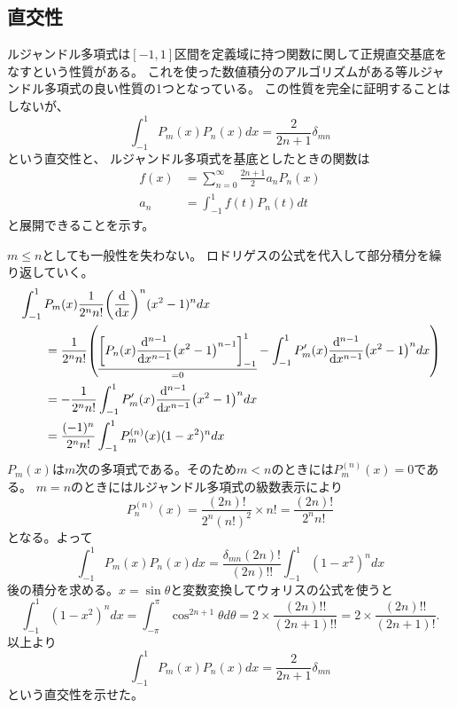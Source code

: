 \documentclass[../../master.tex]{subfiles}
\begin{document}
\subsection{直交性}
ルジャンドル多項式は\([-1, 1]\)区間を定義域に持つ関数に関して正規直交基底をなすという性質がある。
これを使った数値積分のアルゴリズムがある等ルジャンドル多項式の良い性質の1つとなっている。
この性質を完全に証明することはしないが、
\begin{equation}
	\int_{-1}^{1} P_m(x) P_n(x) dx = \frac{2}{2n+1}\delta_{mn}
\end{equation}
という直交性と、
ルジャンドル多項式を基底としたときの関数は
\begin{align}
	f(x) & = \sum_{n=0}^{\infty} \frac{2n+1}{2}a_n P_n(x) \\
	a_n  & =\int_{-1}^{1}f(t)P_n(t) dt
\end{align}
と展開できることを示す。

\(m\leq n\)としても一般性を失わない。
ロドリゲスの公式を代入して部分積分を繰り返していく。
\begin{equation}\begin{aligned}[b]
    & \int_{-1}^{1} P_m(x) \frac{1}{2^n n!} \qty(\dv{x})^n (x^2-1)^n dx \\
	 & \qquad = \frac{1}{2^n n!}
	\qty(
	\underset{=0}{\underline{
			\qty[P_n(x)\dv[n-1]{x}(x^2-1)^{n-1}]_{-1}^{1}
		}}
	- \int_{-1}^{1}P_m'(x)\dv[n-1]{x}(x^2-1)^n dx
	)                                                                           \\
	 & \qquad=-\frac{1}{2^n n!}\int_{-1}^{1}P_m'(x)\dv[n-1]{x}(x^2-1)^n dx      \\
	 & \qquad=\frac{(-1)^n}{2^n n!}\int_{-1}^{1} P_m^{(n)}(x)(1-x^2)^n dx
\end{aligned}\end{equation}
\(P_m(x)\)は\(m\)次の多項式である。そのため\(m<n\)のときには\(P_m^{(n)}(x)=0\)である。
\(m=n\)のときにはルジャンドル多項式の級数表示により
\begin{equation}
	P_n^{(n)}(x) = \frac{(2n)!}{2^n (n!)^2}\times n! = \frac{(2n)!}{2^n n!}
\end{equation}
となる。よって
\begin{equation}
	\int_{-1}^{1} P_m(x) P_n(x) dx
	= \frac{\delta_{mn}(2n)!}{(2n)!!}\int_{-1}^{1} (1-x^2)^n dx
\end{equation}
後の積分を求める。\(x=\sin\theta\)と変数変換してウォリスの公式を使うと
\begin{equation}
	\int_{-1}^{1} (1-x^2)^n dx
	= \int_{-\pi}^{\pi} \cos^{2n+1} \theta d\theta
	= 2 \times \frac{(2n)!!}{(2n+1)!!} = 2 \times \frac{(2n)!!}{(2n+1)!}.
\end{equation}
以上より
\begin{equation}
	\int_{-1}^{1} P_m(x) P_n(x) dx = \frac{2}{2n+1}\delta_{mn}
\end{equation}
という直交性を示せた。
\end{document}
